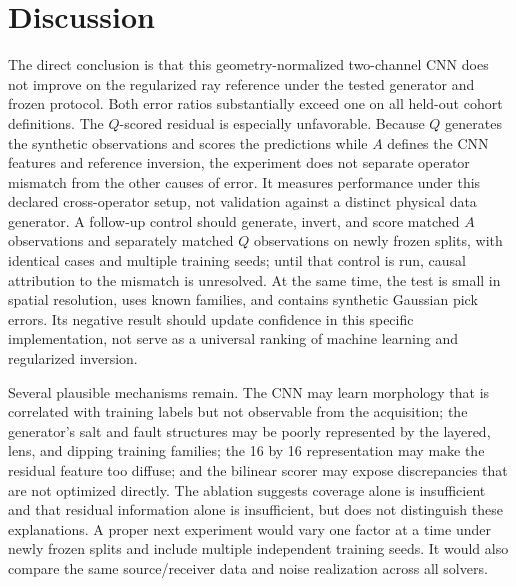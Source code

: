 \documentclass[11pt]{article}
\begin{document}
\section{Discussion}
\label{sec:discussion}
The direct conclusion is that this geometry-normalized two-channel CNN does not improve on the regularized ray reference under the tested generator and frozen protocol. Both error ratios substantially exceed one on all held-out cohort definitions. The $Q$-scored residual is especially unfavorable. Because $Q$ generates the synthetic observations and scores the predictions while $A$ defines the CNN features and reference inversion, the experiment does not separate operator mismatch from the other causes of error. It measures performance under this declared cross-operator setup, not validation against a distinct physical data generator. A follow-up control should generate, invert, and score matched $A$ observations and separately matched $Q$ observations on newly frozen splits, with identical cases and multiple training seeds; until that control is run, causal attribution to the mismatch is unresolved. At the same time, the test is small in spatial resolution, uses known families, and contains synthetic Gaussian pick errors. Its negative result should update confidence in this specific implementation, not serve as a universal ranking of machine learning and regularized inversion.

Several plausible mechanisms remain. The CNN may learn morphology that is correlated with training labels but not observable from the acquisition; the generator's salt and fault structures may be poorly represented by the layered, lens, and dipping training families; the 16 by 16 representation may make the residual feature too diffuse; and the bilinear scorer may expose discrepancies that are not optimized directly. The ablation suggests coverage alone is insufficient and that residual information alone is insufficient, but does not distinguish these explanations. A proper next experiment would vary one factor at a time under newly frozen splits and include multiple independent training seeds. It would also compare the same source/receiver data and noise realization across all solvers.
\end{document}
